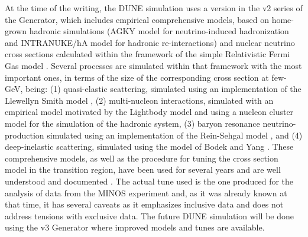 At the time of the  writing, the DUNE simulation uses a version in the v2 series of the  Generator, which includes empirical comprehensive models, based on home-grown hadronic simulations (AGKY model \cite{Yang:2009zx} for neutrino-induced hadronization and INTRANUKE/hA model \cite{Dytman:2015taa} for hadronic re-interactions) and nuclear neutrino cross sections calculated within the framework of the simple Relativistic Fermi Gas model \cite{Bodek:1981wr}. Several processes are simulated within that framework with the most important ones, in terms of the size of the corresponding cross section at few-GeV, being: (1) quasi-elastic scattering, simulated using an implementation of the Llewellyn Smith model \cite{LlewellynSmith:1971uhs}, (2) multi-nucleon interactions, simulated with an empirical model motivated by the Lightbody model \cite{Lightbody:1988gcu} and using a nucleon cluster model for the simulation of the hadronic system, (3) baryon resonance neutrino-production simulated using an implementation of the Rein-Sehgal model \cite{Rein:1980wg}, and (4) deep-inelastic scattering, simulated using the model of Bodek and Yang \cite{Bodek:2002ps}.  These comprehensive models, as well as the  procedure for tuning the cross section model in the transition region, have been used for several years and are well understood and documented \cite{Andreopoulos:2009rq}. The actual tune used is the one produced for the analysis of data from the MINOS experiment and, as it was already known at that time, it has several caveats as it emphasizes inclusive data and does not address tensions with exclusive data. The future DUNE simulation will be done using the v3  Generator where improved models and tunes are available. %

